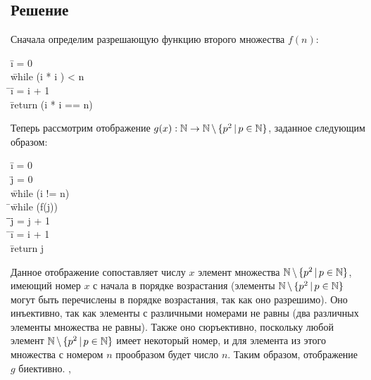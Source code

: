 \documentclass[a4paper,12pt]{article}
\newcommand{\tab}{\quad\=}
\newenvironment{programm}{
    \ttfamily
    \begin{tabbing}
    }
    {
    \end{tabbing}
}
\begin{document}
	\subsection*{Решение}
	Сначала определим разрешающую функцию второго множества $f(n)$:
    \begin{programm}
    \tab i = 0\\
    \tab while (i * i ) < n\\
    \tab\tab i = i + 1\\
    \tab return (i * i == n)
    \end{programm}
    Теперь рассмотрим отображение $g(x): \mathbb{N}\to\mathbb{N}\,\backslash\,\{p^2\,|\,p\in\mathbb{N}\}$, заданное следующим образом:
	
    \begin{programm}
    \tab i = 0\\
    \tab j = 0\\
    \tab while (i != n)\\
    \tab\tab while (f(j))\\
    \tab\tab\tab j = j + 1\\
    \tab\tab i = i + 1\\
    \tab return j
    \end{programm}
	
	Данное отображение сопоставляет числу $x$ элемент множества $\mathbb{N}\,\backslash\,\{p^2\,|\,p\in\mathbb{N}\}$, имеющий номер $x$ с начала в порядке возрастания (элементы $\mathbb{N}\,\backslash\,\{p^2\,|\,p\in\mathbb{N}\}$ могут быть перечислены в порядке возрастания, так как оно разрешимо). Оно инъективно, так как элементы с различными номерами не равны (два различных элементы множества не равны). Также оно сюръективно, поскольку любой элемент $\mathbb{N}\,\backslash\,\{p^2\,|\,p\in\mathbb{N}\}$ имеет некоторый номер, и для элемента из этого множества с номером $n$ прообразом будет число $n$. Таким образом, отображение $g$ биективно.
	\sep	
	
\end{document}
